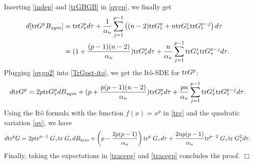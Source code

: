 \documentclass[english, letterpaper,12pt,reqno]{amsart}
\theoremstyle{remark}
\renewenvironment{proof}[1][Proof]{ {\itshape \noindent {#1.}} }{$\Box$
\medskip}
\theoremstyle{plain}
\newcommand{\1}{\mathbf{1}}
\def\tr{{\rm tr}}
\begin{document}
\begin{proof}[Proof of Lemma~\ref{lem:odes}]
\begin{align}
\end{align}
%
Inserting \eqref{indep} and \eqref{trGBGB} in \eqref{qvgp}, we finally get
%
\begin{align}\begin{aligned}
    d[\tr  G^pB_{sym}]
    &=\tr  G_\tau^p d\tau+\frac{1}{\alpha_n}\sum_{j=1}^{p-1}\left( (n-2) \tr  G_\tau^p+n \tr  G_\tau^j \tr  G_\tau^{p-j}\right)d\tau \\
    &= (1+\frac{(p-1)(n-2)}{\alpha_n}) \tr  G_\tau^p d\tau +\frac{n}{\alpha_n}\sum_{j=1}^{p-1}\tr  G_\tau^j \tr  G_\tau^{p-j} d\tau.\end{aligned} \label{qvgp2}
\end{align}
%
Plugging \eqref{qvgp2} into \eqref{TrGpst-ito}, we get the Itô-SDE for $\tr G^p$:
%
 \begin{align}\label{tracegp}
    d \tr  G^p=2p\tr  G_\tau^p dB_{sym}+(p+\frac{p(p-1)(n-2)}{\alpha_n}) \tr  G_\tau^p d\tau +\frac{pn}{\alpha_n}\sum_{j=1}^{p-1}\tr  G_\tau^j \tr  G_\tau^{p-j} d\tau.
\end{align}
%
Using the Itô formula with the function $f(x)=x^p$ in \eqref{trg} and the quadratic variation \eqref{qv}, we have 
 \begin{align}\begin{aligned}
 d\tr^p  G
 =2p \tr^{p-1}\; G_\tau \tr \; G_\tau dB_{\text{sym}} +\left( p-\frac{2p(p-1)}{\alpha_n}\right) \tr^p\; G_\tau d\tau +\frac{2np(p-1)}{\alpha_n}  \tr^{p-2}\;G_\tau\tr\; G_\tau^2  d\tau.    
 \end{aligned}\label{tracepg} 
\end{align}
%
Finally, taking the expectations in \eqref{tracepg} and \eqref{tracegp} concludes the proof. 
\hfill \end{proof}
%
\end{document}
